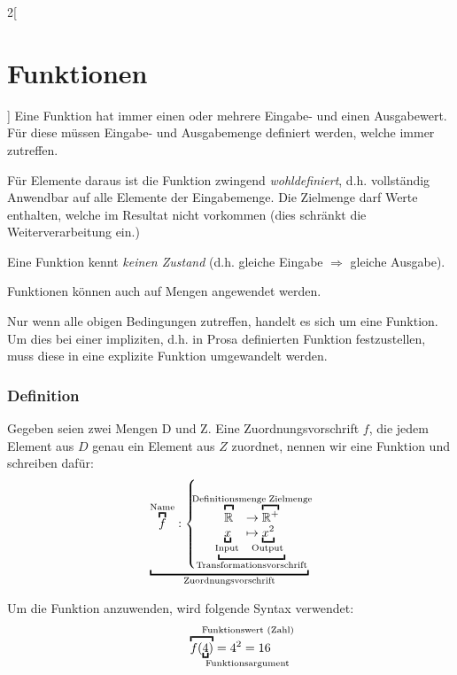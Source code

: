 \begin{multicols}{2}[
	\section{Funktionen}
]
	Eine Funktion hat immer einen oder mehrere Eingabe- und einen Ausgabewert. Für diese müssen Eingabe- und Ausgabemenge definiert werden, welche immer zutreffen.
	
	Für Elemente daraus ist die Funktion zwingend \emph{wohldefiniert}, d.h. vollständig Anwendbar auf alle Elemente der Eingabemenge. Die Zielmenge darf Werte enthalten, welche im Resultat nicht vorkommen (dies schränkt die Weiterverarbeitung ein.)
	
	Eine Funktion kennt \emph{keinen Zustand} (d.h. gleiche Eingabe $\Rightarrow$ gleiche Ausgabe).
	
	Funktionen können auch auf Mengen angewendet werden.
	
	Nur wenn alle obigen Bedingungen zutreffen, handelt es sich um eine Funktion. Um dies bei einer impliziten, d.h. in Prosa definierten Funktion festzustellen, muss diese in eine explizite Funktion umgewandelt werden.


\subsubsection{Definition}
	Gegeben seien zwei Mengen D und Z. Eine Zuordnungsvorschrift $f$, die jedem Element aus $D$ genau ein Element aus $Z$ zuordnet, nennen wir eine Funktion und schreiben dafür:
	\[
		\underbracket{
			\overbracket{f}^\text{Name} : \left\{
			\underbracket{
				\begin{array}{ll}
					\overbracket{
						\mathbb{R}^{\vphantom{+}} %
					}^{
						\mathclap{
							\text{Definitionsmenge}
						}
					}
					& \to \overbracket{
						\mathbb{R}^+
					}^{
						\mathrlap{\!\text{Zielmenge}}
					} \\
					\underbracket{x}_{
						\mathclap{\!\text{Input}}
					}
					& \mapsto \underbracket{x^2}_{
						\mathclap{\!\text{Output}}
					}
				\end{array}
			}_\text{Transformationsvorschrift}
			\right.
		}_\text{Zuordnungsvorschrift}
	\]
	
	Um die Funktion anzuwenden, wird folgende Syntax verwendet:
	\[\overbracket{
		f(\underbracket{4}_{\mathrlap{\text{Funktionsargument}}})
	}^{\mathrlap{\text{Funktionswert (Zahl)}}}
	= 4^2 = 16
	\]
	

\end{multicols}
